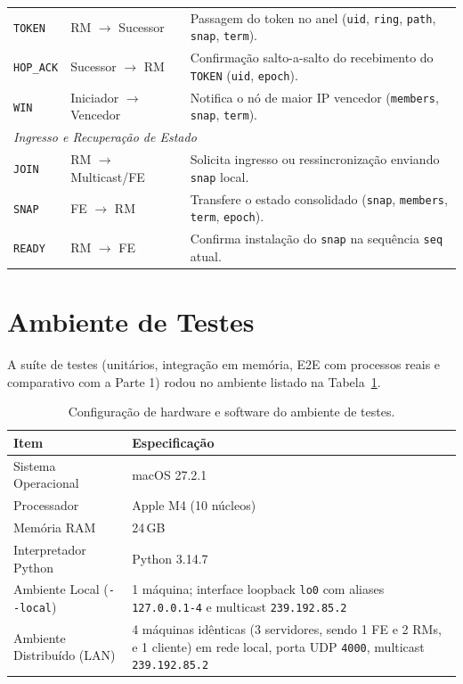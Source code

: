 \documentclass[12pt]{article}
\begin{document}
\begin{table}[!htb]
\begin{tabularx}{\textwidth}{l l X}
\texttt{TOKEN} & RM $\rightarrow$ Sucessor & Passagem do token no anel (\texttt{uid}, \texttt{ring}, \texttt{path}, \texttt{snap}, \texttt{term}). \\
\texttt{HOP\_ACK} & Sucessor $\rightarrow$ RM & Confirmação salto-a-salto do recebimento do \texttt{TOKEN} (\texttt{uid}, \texttt{epoch}). \\
\texttt{WIN} & Iniciador $\rightarrow$ Vencedor & Notifica o nó de maior IP vencedor (\texttt{members}, \texttt{snap}, \texttt{term}). \\
\midrule
\multicolumn{3}{l}{\textit{Ingresso e Recuperação de Estado}} \\
\texttt{JOIN} & RM $\rightarrow$ Multicast/FE & Solicita ingresso ou ressincronização enviando \texttt{snap} local. \\
\texttt{SNAP} & FE $\rightarrow$ RM & Transfere o estado consolidado (\texttt{snap}, \texttt{members}, \texttt{term}, \texttt{epoch}). \\
\texttt{READY} & RM $\rightarrow$ FE & Confirma instalação do \texttt{snap} na sequência \texttt{seq} atual. \\
\bottomrule
\end{tabularx}
\end{table}

\section{Ambiente de Testes}

A suíte de testes (unitários, integração em memória, E2E com processos reais e comparativo com a Parte 1) rodou no ambiente listado na Tabela~\ref{tab:ambiente}.

\begin{table}[H]
\centering
\caption{Configuração de hardware e software do ambiente de testes.}
\label{tab:ambiente}
\small
\begin{tabularx}{\textwidth}{l X}
\toprule
\textbf{Item} & \textbf{Especificação} \\
\midrule
Sistema Operacional & macOS 27.2.1 \\
Processador & Apple M4 (10 núcleos) \\
Memória RAM & 24\,GB \\
Interpretador Python & Python 3.14.7 \\
Ambiente Local (\texttt{-{-}local}) & 1 máquina; interface loopback \texttt{lo0} com aliases \texttt{127.0.0.1-4} e multicast \texttt{239.192.85.2} \\
Ambiente Distribuído (LAN) & 4 máquinas idênticas (3 servidores, sendo 1 FE e 2 RMs, e 1 cliente) em rede local, porta UDP \texttt{4000}, multicast \texttt{239.192.85.2} \\
\bottomrule
\end{tabularx}
\end{table}
\end{document}
